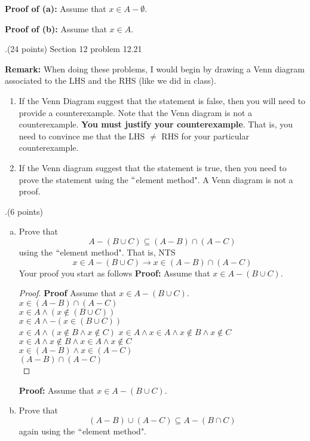 \documentclass[12pt]{article}
\begin{document}
\noindent \textbf{Proof of (a):}  Assume that $x \in A - \emptyset$.  
\vspace{.15in}

\noindent \textbf{Proof of (b):}  Assume that $x \in A$.  
\vspace{.15in}





.(24 points)  Section 12 problem 12.21
\vspace{.15in}

\noindent \textbf{Remark:} When doing these problems, I would begin by drawing a Venn diagram associated to the LHS and the RHS (like we did in class). 
\begin{enumerate}
    \item If the Venn Diagram suggest that the statement is false, then you will need to provide a counterexample.  Note that the Venn diagram is not a counterexample.  \textbf{You must justify your counterexample}.  That is, you need to convince me that the LHS $\neq$ RHS for your particular counterexample. 
    \item If the Venn diagram suggest that the statement is true, then you need to prove the statement using the $``$element method".  A Venn diagram is not a proof.  
\end{enumerate}



.(6 points) 
\begin{enumerate}[(a).]
    \item Prove that 
\[
A - (B \cup C) \subseteq (A -B) \cap (A - C)
\]
using the $``$element method".  That is, NTS
\[
x \in A - (B \cup C) \longrightarrow x \in (A - B) \cap (A - C)
\]
Your proof you start as follows
\vspace{.15in}
\noindent \textbf{Proof:} Assume that $x \in A - (B \cup C).$
\begin{proof}
\textbf{Proof} Assume that $x \in A - (B \cup C).$\\
\Rightarrow $ x \in (A-B) \cap (A-C)$ \\
\Rightarrow $ x \in A \wedge (x \notin (B \cup C))$\\
\Rightarrow $ x \in A \wedge -(x \in (B \cup C))$\\
\Rightarrow $ x \in A \wedge (x \notin B \wedge x \notin C)$
\Rightarrow $ x \in A \wedge x \in A \wedge x \notin B \wedge x \notin C$ \\
\Rightarrow $ x \in A \wedge x \notin B \wedge x \in A \wedge x \notin C$ \\
\Rightarrow $ x \in (A-B) \wedge x \in (A-C)$ \\
\Rightarrow $ (A-B) \cap (A-C)$ \\

\end{proof}






\noindent \textbf{Proof:} Assume that $x \in A - (B \cup C).$
\item Prove that 
\[
(A - B) \cup (A - C) \subseteq A - (B \cap C)
\]
again using the $``$element method".  
\end{enumerate}
\end{document}
